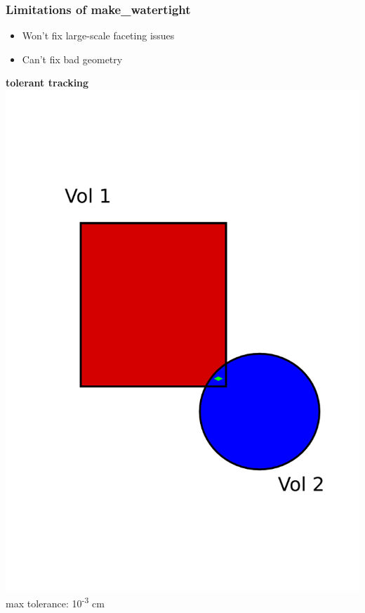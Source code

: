 \documentclass[14pt]{beamer}
\begin{document}
\begin{frame}
\frametitle{Limitations of make\_watertight}
\begin{itemize}
\item Won't fix large-scale faceting issues
\item Can't fix bad geometry
\end{itemize}
\begin{center}
\textbf{tolerant tracking}
\vfill
\includegraphics[scale=0.2, trim = 0 0 100 100]{VolOverlap.png}
max tolerance: 10\textsuperscript{-3} cm
\end{center}

\end{frame}
\end{document}
